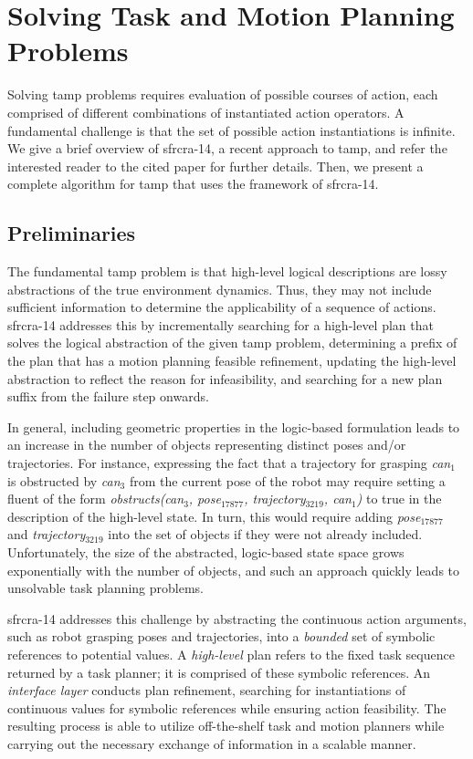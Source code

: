 \section{Solving Task and Motion Planning Problems}
Solving {\sc tamp} problems requires evaluation of possible courses of
action, each comprised of different combinations of instantiated
action operators. A fundamental challenge is that the set of possible
action instantiations is infinite.  We give a brief overview of {\sc
  sfrcra-14}, a recent approach to {\sc tamp}, and refer the
interested reader to the cited paper for further details.  Then, we
present a complete algorithm for {\sc tamp} that uses the framework of
{\sc sfrcra-14}.

\subsection{Preliminaries}
The fundamental {\sc tamp} problem is that high-level logical
descriptions are lossy abstractions of the true environment
dynamics. Thus, they may not include sufficient information to
determine the applicability of a sequence of actions.  {\sc sfrcra-14}
addresses this by incrementally searching for a high-level plan that
solves the logical abstraction of the given {\sc tamp} problem,
determining a prefix of the plan that has a motion planning feasible
refinement, updating the high-level abstraction to reflect the reason
for infeasibility, and searching for a new plan suffix from the
failure step onwards.

In general, including geometric properties in the logic-based
formulation leads to an increase in the number of objects representing
distinct poses and/or trajectories. For instance, expressing the fact
that a trajectory for grasping \emph{can$_1$} is obstructed by
\emph{can$_3$} from the current pose of the robot may require
setting a fluent of the form \emph{obstructs(can$_3$, pose$_{17877}$,
  trajectory$_{3219}$, can$_1$)} to true in the description of the
high-level state. In turn, this would require adding
\emph{pose$_{17877}$} and \emph{trajectory$_{3219}$} into the set of
objects if they were not already included. Unfortunately, the size of
the abstracted, logic-based state space grows exponentially with the
number of objects, and such an approach quickly leads to unsolvable
task planning problems.

{\sc sfrcra-14} addresses this challenge by abstracting the continuous
action arguments, such as robot grasping poses and trajectories, into
a \emph{bounded} set of symbolic references to potential values. A
\emph{high-level} plan refers to the fixed task
sequence returned by a task planner; it is comprised of these symbolic
references. An \emph{interface layer} conducts plan refinement,
searching for instantiations of continuous values for symbolic
references while ensuring action feasibility.  The resulting process
is able to utilize off-the-shelf task and motion planners while
carrying out the necessary exchange of information in a scalable
manner.

